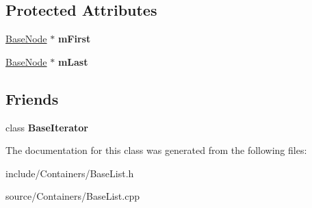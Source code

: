 \subsection*{Protected Attributes}
\begin{DoxyCompactItemize}
\item 
\hyperlink{classDE_1_1BaseList_1_1BaseNode}{Base\+Node} $\ast$ {\bfseries m\+First}\hypertarget{classDE_1_1BaseList_ac5593890d21a73cfa4c837f87b5db5b1}{}\label{classDE_1_1BaseList_ac5593890d21a73cfa4c837f87b5db5b1}

\item 
\hyperlink{classDE_1_1BaseList_1_1BaseNode}{Base\+Node} $\ast$ {\bfseries m\+Last}\hypertarget{classDE_1_1BaseList_a757f5ad3193919dd4e81f259e07b07af}{}\label{classDE_1_1BaseList_a757f5ad3193919dd4e81f259e07b07af}

\end{DoxyCompactItemize}
\subsection*{Friends}
\begin{DoxyCompactItemize}
\item 
class {\bfseries Base\+Iterator}\hypertarget{classDE_1_1BaseList_a95d719a456031e0a03c45a657435f35b}{}\label{classDE_1_1BaseList_a95d719a456031e0a03c45a657435f35b}

\end{DoxyCompactItemize}


The documentation for this class was generated from the following files\+:\begin{DoxyCompactItemize}
\item 
include/\+Containers/Base\+List.\+h\item 
source/\+Containers/Base\+List.\+cpp\end{DoxyCompactItemize}
